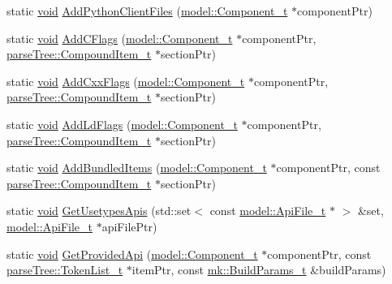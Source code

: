 \begin{DoxyCompactItemize}
\item 
static \hyperlink{_t_e_m_p_l_a_t_e__cdef_8h_ac9c84fa68bbad002983e35ce3663c686}{void} \hyperlink{namespacemodeller_a4f4b48db28fc6b0166d5ac98a23e8717}{Add\+Python\+Client\+Files} (\hyperlink{structmodel_1_1_component__t}{model\+::\+Component\+\_\+t} $\ast$component\+Ptr)
\item 
static \hyperlink{_t_e_m_p_l_a_t_e__cdef_8h_ac9c84fa68bbad002983e35ce3663c686}{void} \hyperlink{namespacemodeller_ac8733a53babe3721b7f914b21dd771ee}{Add\+C\+Flags} (\hyperlink{structmodel_1_1_component__t}{model\+::\+Component\+\_\+t} $\ast$component\+Ptr, \hyperlink{structparse_tree_1_1_compound_item__t}{parse\+Tree\+::\+Compound\+Item\+\_\+t} $\ast$section\+Ptr)
\item 
static \hyperlink{_t_e_m_p_l_a_t_e__cdef_8h_ac9c84fa68bbad002983e35ce3663c686}{void} \hyperlink{namespacemodeller_a8b6ded38c1deed52aa5adc8c62c7ec2e}{Add\+Cxx\+Flags} (\hyperlink{structmodel_1_1_component__t}{model\+::\+Component\+\_\+t} $\ast$component\+Ptr, \hyperlink{structparse_tree_1_1_compound_item__t}{parse\+Tree\+::\+Compound\+Item\+\_\+t} $\ast$section\+Ptr)
\item 
static \hyperlink{_t_e_m_p_l_a_t_e__cdef_8h_ac9c84fa68bbad002983e35ce3663c686}{void} \hyperlink{namespacemodeller_a8669ced786d7e759bb697547ddce4029}{Add\+Ld\+Flags} (\hyperlink{structmodel_1_1_component__t}{model\+::\+Component\+\_\+t} $\ast$component\+Ptr, \hyperlink{structparse_tree_1_1_compound_item__t}{parse\+Tree\+::\+Compound\+Item\+\_\+t} $\ast$section\+Ptr)
\item 
static \hyperlink{_t_e_m_p_l_a_t_e__cdef_8h_ac9c84fa68bbad002983e35ce3663c686}{void} \hyperlink{namespacemodeller_a2facde40890065e97efb4ae8eaa70378}{Add\+Bundled\+Items} (\hyperlink{structmodel_1_1_component__t}{model\+::\+Component\+\_\+t} $\ast$component\+Ptr, const \hyperlink{structparse_tree_1_1_compound_item__t}{parse\+Tree\+::\+Compound\+Item\+\_\+t} $\ast$section\+Ptr)
\item 
static \hyperlink{_t_e_m_p_l_a_t_e__cdef_8h_ac9c84fa68bbad002983e35ce3663c686}{void} \hyperlink{namespacemodeller_aa094886b0f6ff96c43f160daa2d0b95a}{Get\+Usetypes\+Apis} (std\+::set$<$ const \hyperlink{structmodel_1_1_api_file__t}{model\+::\+Api\+File\+\_\+t} $\ast$ $>$ \&set, \hyperlink{structmodel_1_1_api_file__t}{model\+::\+Api\+File\+\_\+t} $\ast$api\+File\+Ptr)
\item 
static \hyperlink{_t_e_m_p_l_a_t_e__cdef_8h_ac9c84fa68bbad002983e35ce3663c686}{void} \hyperlink{namespacemodeller_a5dbf8cdcdc59f2b93f6c514918f99841}{Get\+Provided\+Api} (\hyperlink{structmodel_1_1_component__t}{model\+::\+Component\+\_\+t} $\ast$component\+Ptr, const \hyperlink{structparse_tree_1_1_token_list__t}{parse\+Tree\+::\+Token\+List\+\_\+t} $\ast$item\+Ptr, const \hyperlink{structmk_1_1_build_params__t}{mk\+::\+Build\+Params\+\_\+t} \&build\+Params)

\end{DoxyCompactItemize}
